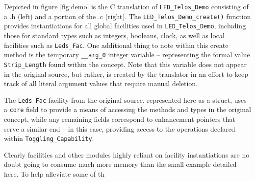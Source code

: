 Depicted in figure \ref{fig:demo} is the C translation of \texttt{LED\_Telos\_Demo} consisting of a .h (left) and a portion of the .c (right). The \texttt{LED\_Telos\_Demo\_create()} function provides instantiations for all global facilities used in \texttt{LED\_Telos\_Demo}, including those for standard types such as integers, booleans, clock, as well as local facilities such as \texttt{Leds\_Fac}. One additional thing to note within this create method is the temporary \texttt{\_\_arg\_0} integer variable -- representing the formal value \texttt{Strip\_Length} found within the concept. Note that this variable does not appear in the original source, but rather, is created by the translator in an effort to keep track of all literal argument values that require manual deletion.

The \texttt{Leds\_Fac} facility from the original source, represented here as a struct, uses a \texttt{core} field to provide a means of accessing the methods and types in the original concept, while any remaining fields correspond to enhancement pointers that serve a similar end -- in this case, providing access to the operations declared within  \texttt{Toggling\_Capability}.

Clearly facilities and other modules highly reliant on facility instantiations are no doubt going to consume much more memory than the small example detailed here. To help alleviate some of th



